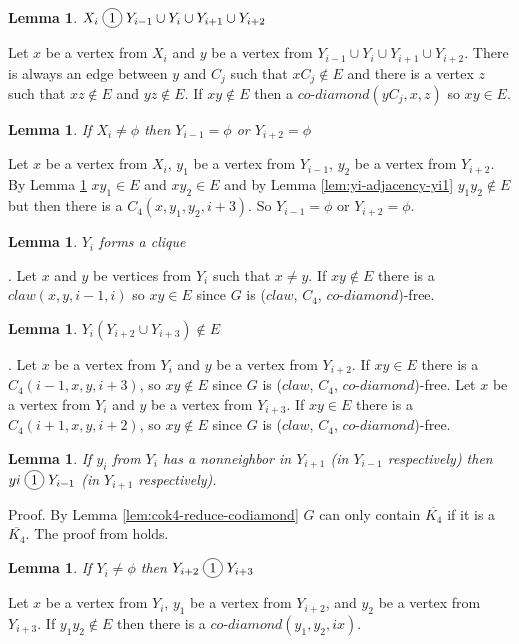 \documentclass[12pt]{article}
\newcommand*\circled[1]{\tikz[baseline=(char.base)]{
            \node[shape=circle,draw,inner sep=2pt] (char) {#1};}}
\newtheorem{Lemma}[Theorem]{Lemma}
\def\CCD{($claw$, $C_4$, $co$-$diamond$)}
\begin{document}
\begin{Lemma}\label{lem:2k-join-3k}
$X_i \;\circled{1}\; Y_{i-1} \cup Y_{i} \cup Y_{i+1} \cup Y_{i+2}$ 
\end{Lemma}
 Let $x$ be a vertex from $X_i$ and $y$ be a vertex from $Y_{i-1} \cup Y_{i} \cup Y_{i+1} \cup Y_{i+2}$. There is always an edge between $y$ and $C_j$ such that $xC_j \not\in E$ and there is a vertex $z$ such that $xz \not \in E$ and $yz \not \in E$. If $xy \not \in E$ then a $co$-$diamond (yC_j, x, z)$ so $xy \in E$.

\begin{Lemma}\label{lem:Xi-Yi-noYi}
If $X_i \neq \phi$ then $Y_{i-1} =\phi$ or $Y_{i+2} = \phi$
\end{Lemma}
 Let $x$ be a vertex from $X_i$, $y_1$ be a vertex from $Y_{i-1}$, $y_2$ be a vertex from $Y_{i+2}$. By Lemma \ref{lem:2k-join-3k} $xy_1 \in E$ and $xy_2 \in E$ and by Lemma \ref{lem:yi-adjacency-yi1} $y_1y_2 \not \in E$ but then there is a $C_4 (x, y_1, y_2, i+3)$. So $Y_{i-1} = \phi$ or $Y_{i+2} = \phi$.

\begin{Lemma}\label{lem:3K-clique}
$Y_i$ forms a clique
\end{Lemma}
. Let $x$ and $y$ be vertices from $Y_i$ such that $x \neq y$. If $xy \not \in E$ there is a $claw (x, y, i-1, i)$ so $xy \in E$ since $G$ is {\CCD}-free.

\begin{Lemma}\label{lem:yi-adjacency-yi2}
$Y_i(Y_{i+2} \cup Y_{i+3}) \not \in E$
\end{Lemma}
. Let $x$ be a vertex from $Y_i$ and $y$ be a vertex from $Y_{i+2}$. If $xy \in E$ there is a $C_4 (i-1, x, y, i+3)$, so $xy \not \in E$ since $G$ is {\CCD}-free. Let $x$ be a vertex from $Y_i$ and $y$ be a vertex from $Y_{i+3}$. If $xy \in E$ there is a $C_4 (i+1, x, y, i+2)$, so $xy \not \in E$ since $G$ is {\CCD}-free.

\begin{Lemma}\label{lem:yi-miss-two-neighbors}
If $y_i$ from $Y_i$ has a nonneighbor in $Y_{i+1}$ (in $Y_{i-1}$ respectively) then $yi \;\circled{1}\; Y_{i-1}$ (in $Y_{i+1}$ respectively).
\end{Lemma}
\noindent {\it} Proof. By Lemma \ref{lem:cok4-reduce-codiamond} $G$ can only contain $\overline{K_4}$ if it is a $\overline{K_4}$. The proof from \cite{BrEnLeLo} holds.

\begin{Lemma}\label{lem:yi-force-join}
If $Y_i \neq \phi$ then $Y_{i+2} \;\circled{1}\; Y_{i+3}$
\end{Lemma}
 Let $x$ be a vertex from $Y_i$, $y_1$ be a vertex from $Y_{i+2}$, and $y_2$ be a vertex from $Y_{i+3}$. If $y_1y_2\not\in E$ then there is a $co$-$diamond (y_1, y_2, ix)$. 
\end{document}
